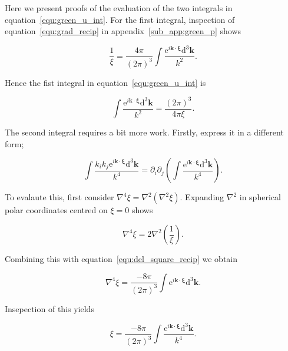 \documentclass[12pt]{article}
\begin{document}
Here we present proofs of the evaluation of the two integrals in equation~\ref{equ:green_u_int}. For the first integral, inspection of equation~\ref{equ:grad_recip} in appendix~\ref{sub_app:green_p} shows

\begin{equation}
\label{equ:recip_int}
\frac{1}{\xi} = \frac{4 \pi}{(2 \pi)^{3}} \int \frac{\mathrm{e}^{i \boldsymbol{k} \cdot \boldsymbol{\xi}} \mathrm{d}^{3} \boldsymbol{k}}{k^{2}} .
\end{equation}

Hence the fist integral in equation~\ref{equ:green_u_int} is

\begin{equation}
\label{equ:green_u_int1}
\int \frac{\mathrm{e}^{i \boldsymbol{k} \cdot \boldsymbol{\xi}} \mathrm{d}^{3} \boldsymbol{k}}{k^{2}} = \frac{(2 \pi)^{3}}{4 \pi \xi} .
\end{equation}

The second integral requires a bit more work. Firstly, express it in a different form;

\begin{equation}
\label{equ:green_u_int2_new}
\int \frac{k_{i} k_{j} \mathrm{e}^{i \boldsymbol{k} \cdot \boldsymbol{\xi}} \mathrm{d}^{3} \boldsymbol{k}}{k^{4}} = \partial_{i} \partial_{j} \left(\int \frac{\mathrm{e}^{i \boldsymbol{k} \cdot \boldsymbol{\xi}} \mathrm{d}^{3} \boldsymbol{k}}{k^{4}} \right) .
\end{equation}

To evalaute this, first consider $\nabla^{4} \xi = \nabla^{2}(\nabla^{2} \xi)$. Expanding $\nabla^{2}$ in spherical polar coordinates centred on $\xi = 0$ shows

\begin{equation}
\label{equ:del4}
\nabla^{4} \xi = 2 \nabla^{2} \left(\frac{1}{\xi}\right) .
\end{equation}

Combining this with equation~\ref{equ:del_square_recip} we obtain

\begin{equation}
\label{equ:del4_int}
\nabla^{4} \xi = \frac{-8 \pi}{(2 \pi)^{3}} \int \mathrm{e}^{i \boldsymbol{k} \cdot \boldsymbol{\xi}} \mathrm{d}^{3} \boldsymbol{k} .
\end{equation}

Insepection of this yields

\begin{equation}
\label{equ:del4_int_int}
\xi = \frac{-8 \pi}{(2 \pi)^{3}} \int \frac{\mathrm{e}^{i \boldsymbol{k} \cdot \boldsymbol{\xi}} \mathrm{d}^{3} \boldsymbol{k}}{k^{4}} .
\end{equation}
\end{document}
